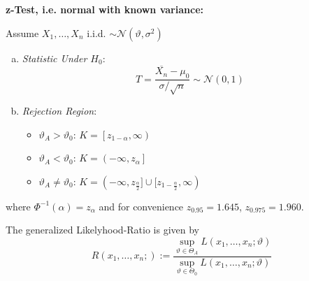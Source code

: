 \begin{boxyellow}
\textbf{z-Test, i.e. normal with known variance:} 	

	Assume $X_{1}, \ldots, X_{n}$ i.i.d. $\sim \mathcal{N}\left(\vartheta, \sigma^{2}\right)$
	\begin{enumerate}[a)]
		\item \textit{Statistic Under $H_0$}:
		\[
			T=\frac{\overline{X_n}-\mu_0}{\sigma/\sqrt{n}} \sim \mathcal{N}(0,1)
		\]
		\item \textit{Rejection Region}:
		\begin{itemize}
			\item $\vartheta_A>\vartheta_{0}$: $K = \left[z_{1-\alpha},\infty\right)$
			\item $\vartheta_A<\vartheta_{0}$: $K = \left(-\infty, z_\alpha\right]$
			\item $\vartheta_A\neq\vartheta_{0}$: $K = (-\infty, z_{\frac{\alpha}{2}}]\cup [z_{1-\frac{\alpha}{2}},\infty)$
		\end{itemize}
	\end{enumerate}	
where $\Phi^{-1}(\alpha)=z_\alpha$ and for convenience $z_{0.95}=1.645$, $z_{0.975}=1.960$.
\end{boxyellow}

\begin{boxlavender}
The generalized Likelyhood-Ratio is given by
$$
R\left(x_{1}, \ldots, x_{n} ;\right):=\frac{\sup_{\vartheta \in \Theta_A} L\left(x_{1}, \ldots, x_{n} ; \vartheta\right)}{\sup_{\vartheta \in \Theta_0} L\left(x_{1}, \ldots, x_{n} ; \vartheta\right)}
$$
\end{boxlavender}

